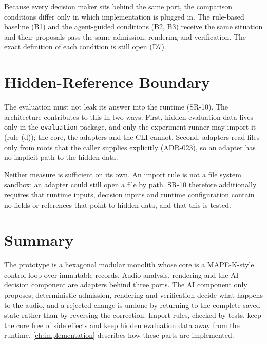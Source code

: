 
Because every decision maker sits behind the same port, the comparison conditions differ only in which implementation is plugged in. The rule-based baseline (B1) and the agent-guided conditions (B2, B3) receive the same situation and their proposals pass the same admission, rendering and verification. The exact definition of each condition is still open (D7).

\section{Hidden-Reference Boundary}
\label{sec:arch-hidden}

The evaluation must not leak its answer into the runtime (SR-10). The architecture contributes to this in two ways. First, hidden evaluation data lives only in the \texttt{evaluation} package, and only the experiment runner may import it (rule (d)); the core, the adapters and the \ac{CLI} cannot. Second, adapters read files only from roots that the caller supplies explicitly (ADR-023), so an adapter has no implicit path to the hidden data.

Neither measure is sufficient on its own. An import rule is not a file system sandbox: an adapter could still open a file by path. SR-10 therefore additionally requires that runtime inputs, decision inputs and runtime configuration contain no fields or references that point to hidden data, and that this is tested.


\section{Summary}
\label{sec:arch-summary}

The prototype is a hexagonal modular monolith whose core is a \ac{MAPE-K}-style control loop over immutable records. Audio analysis, rendering and the \ac{AI} decision component are adapters behind three ports. The \ac{AI} component only proposes; deterministic admission, rendering and verification decide what happens to the audio, and a rejected change is undone by returning to the complete saved state rather than by reversing the correction. Import rules, checked by tests, keep the core free of side effects and keep hidden evaluation data away from the runtime. \autoref{ch:implementation} describes how these parts are implemented.
